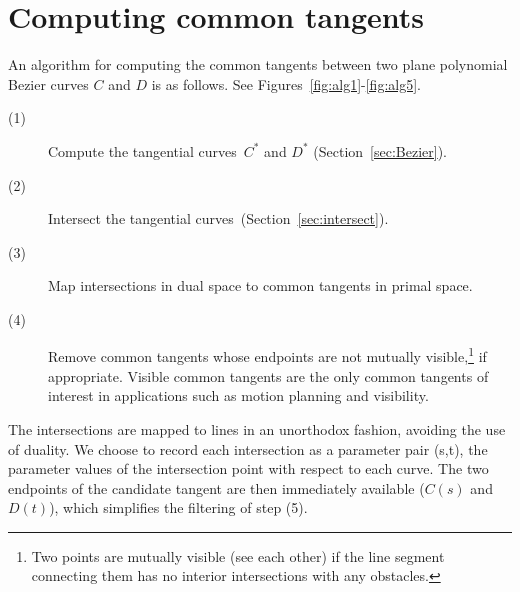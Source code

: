 \documentclass[11pt]{article}
\newcommand{\tangs}{tangential curves\ }
\begin{document}

\clearpage

\section{Computing common tangents}
\label{sec:alg}

An algorithm for computing the common tangents between
two plane polynomial Bezier curves $C$ and $D$ is as follows.
See Figures~\ref{fig:alg1}-\ref{fig:alg5}.
\begin{description}
\item[(1)]	Compute the \tangs $C^*$ and $D^*$ (Section~\ref{sec:Bezier}).
\item[(2)]	Intersect the \tangs (Section~\ref{sec:intersect}).
\item[(3)]	Map intersections in dual space to common tangents in primal space.
\item[(4)]	Remove common tangents whose endpoints
		are not mutually visible,\footnote{Two points 
			are mutually visible (see each other) 
			if the line segment connecting them
			has no interior intersections with any obstacles.}
		if appropriate.
		Visible common tangents are the only common tangents of interest
		in applications such as motion planning and visibility.
\end{description}

The intersections are mapped to lines in an unorthodox fashion, 
avoiding the use of duality.
We choose to record each intersection as a parameter pair (s,t),
the parameter values of the intersection point with respect to each curve.
The two endpoints of the candidate tangent are then immediately available
($C(s)$ and $D(t)$), which simplifies the filtering of step (5).
\end{document}

